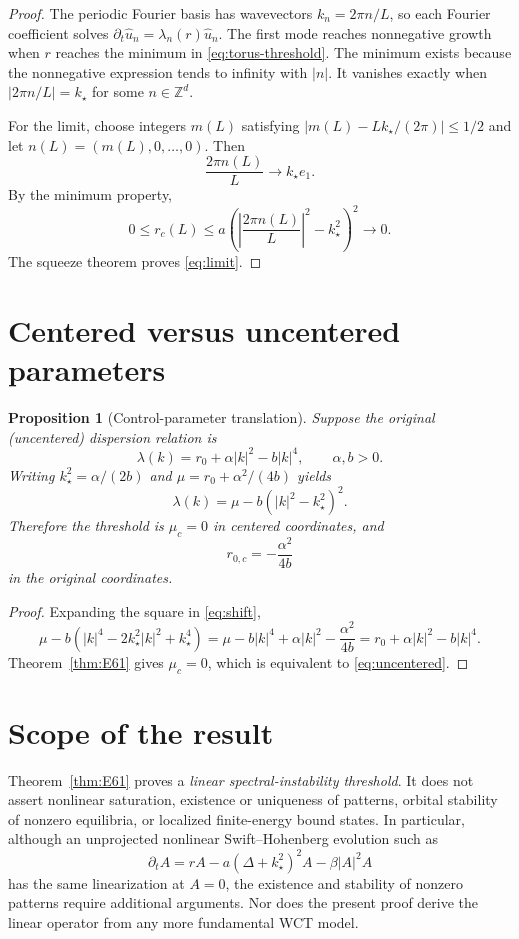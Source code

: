 \documentclass[11pt]{article}
\newtheorem{proposition}{Proposition}
\newcommand{\Z}{\mathbb{Z}}
\begin{document}
\begin{proof}
The periodic Fourier basis has wavevectors $k_n=2\pi n/L$,
so each Fourier coefficient solves
$\partial_t\widehat u_n=\lambda_n(r)\widehat u_n$.
The first mode reaches nonnegative growth when $r$ reaches the minimum
in \eqref{eq:torus-threshold}. The minimum exists because the
nonnegative expression tends to infinity with $|n|$. It vanishes
exactly when $|2\pi n/L|=k_\star$ for some $n\in\Z^d$.

For the limit, choose integers $m(L)$ satisfying
$|m(L)-Lk_\star/(2\pi)|\le1/2$ and let
$n(L)=(m(L),0,\ldots,0)$. Then
\[
\frac{2\pi n(L)}{L}\longrightarrow k_\star e_1.
\]
By the minimum property,
\[
0\le r_c(L)
\le a\left(\left|\frac{2\pi n(L)}L\right|^2-k_\star^2\right)^2
\longrightarrow0.
\]
The squeeze theorem proves \eqref{eq:limit}.
\end{proof}

\section{Centered versus uncentered parameters}

\begin{proposition}[Control-parameter translation]\label{prop:shift}
Suppose the original (uncentered) dispersion relation is
\[
\lambda(k)=r_0+\alpha|k|^2-b|k|^4,
\qquad \alpha,b>0.
\]
Writing $k_\star^2=\alpha/(2b)$ and
$\mu=r_0+\alpha^2/(4b)$ yields
\begin{equation}\label{eq:shift}
\lambda(k)=\mu-b(|k|^2-k_\star^2)^2.
\end{equation}
Therefore the threshold is $\mu_c=0$ in centered coordinates, and
\begin{equation}\label{eq:uncentered}
\boxed{r_{0,c}=-\frac{\alpha^2}{4b}}
\end{equation}
in the original coordinates.
\end{proposition}

\begin{proof}
Expanding the square in \eqref{eq:shift},
\[
\mu-b\left(|k|^4-2k_\star^2|k|^2+k_\star^4\right)
=\mu-b|k|^4+\alpha|k|^2-\frac{\alpha^2}{4b}
=r_0+\alpha|k|^2-b|k|^4.
\]
Theorem~\ref{thm:E61} gives $\mu_c=0$, which is equivalent to
\eqref{eq:uncentered}.
\end{proof}

\section{Scope of the result}

Theorem~\ref{thm:E61} proves a \emph{linear spectral-instability
threshold}. It does not assert nonlinear saturation, existence or
uniqueness of patterns, orbital stability of nonzero equilibria,
or localized finite-energy bound states. In particular, although an
unprojected nonlinear Swift--Hohenberg evolution such as
\[
\partial_t A=rA-a(\Delta+k_\star^2)^2A-\beta|A|^2A
\]
has the same linearization at $A=0$, the existence and stability of
nonzero patterns require additional arguments. Nor does the present
proof derive the linear operator from any more fundamental WCT model.
\end{document}
